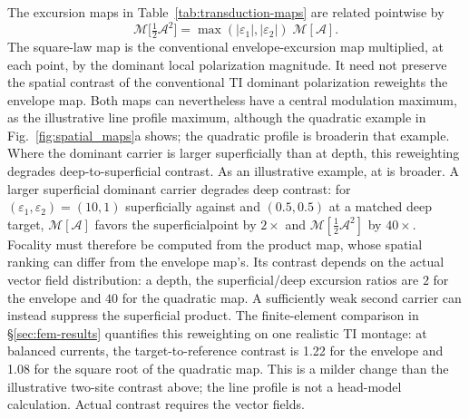\documentclass[11pt,a4paper]{article}
\newcommand{\half}{\tfrac{1}{2}}
\providecommand{\DIFaddtex}[1]{{\protect\color{blue} \sf #1}} %
\providecommand{\DIFdeltex}[1]{{\protect\color{red} \scriptsize #1}} %
\providecommand{\DIFaddbegin}{} %
\providecommand{\DIFaddend}{} %
\providecommand{\DIFdelbegin}{} %
\providecommand{\DIFdelend}{} %
\providecommand{\DIFadd}[1]{\texorpdfstring{\DIFaddtex{#1}}{#1}} %
\providecommand{\DIFdel}[1]{\texorpdfstring{\DIFdeltex{#1}}{}} %
\begin{document}
The excursion maps in Table~\ref{tab:transduction-maps} are related pointwise by
\begin{equation}
\mathcal{M}\big[\tfrac12\mathcal A^2\big]=\max(|\varepsilon_1|,|\varepsilon_2|)\;\mathcal{M}[\mathcal A].
\label{eq:reweight}
\end{equation}
The \DIFdelbegin \DIFdel{square-law map is the conventional envelope-excursion map multiplied, at each point,
by the dominant local polarization magnitude. It need not preserve the spatial contrast
of the conventional TI }\DIFdelend \DIFaddbegin \DIFadd{dominant polarization reweights the envelope }\DIFaddend map. Both maps can \DIFdelbegin \DIFdel{nevertheless }\DIFdelend have a
central \DIFdelbegin \DIFdel{modulation
maximum, as the illustrative line profile }\DIFdelend \DIFaddbegin \DIFadd{maximum, although the quadratic example }\DIFaddend in Fig.~\ref{fig:spatial_maps}a
\DIFdelbegin \DIFdel{shows;
the quadratic profile is broaderin that example. Where the dominant carrier is larger superficially than at depth,
this reweighting degrades deep-to-superficial contrast. As an illustrative example, at
}\DIFdelend \DIFaddbegin \DIFadd{is broader. A larger superficial dominant carrier degrades deep contrast:
for }\DIFaddend $(\varepsilon_1,\varepsilon_2)=(10,1)$ superficially \DIFdelbegin \DIFdel{against }\DIFdelend \DIFaddbegin \DIFadd{and }\DIFaddend $(0.5,0.5)$
at \DIFdelbegin \DIFdel{a matched
deep target, $\mathcal{M}[\mathcal A]$ favors the superficialpoint by $2\times$ and $\mathcal{M}[\half \mathcal A^2]$ by $40\times$. Focality must therefore be computed from the product map, whose spatial ranking
can differ from the envelope map's. Its contrast depends on the actual vector
field distribution: a }\DIFdelend \DIFaddbegin \DIFadd{depth, the superficial/deep excursion ratios are $2$ for the envelope
and $40$ for the quadratic map. A }\DIFaddend sufficiently weak second carrier can
\DIFaddbegin \DIFadd{instead }\DIFaddend suppress the superficial product. \DIFdelbegin \DIFdel{The finite-element comparison in \S\ref{sec:fem-results}
quantifies this reweighting on one realistic TI montage: at balanced currents,
the target-to-reference contrast is 1.22 for the
envelope and 1.08 for the
square root of the quadratic map.
This is a milder change than the illustrative
two-site contrast above; the line profile is not a head-model calculation.
}\DIFdelend \DIFaddbegin \DIFadd{Actual contrast requires the
vector fields.
}\DIFaddend
\end{document}
